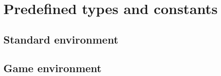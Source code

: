 \section{Predefined types and constants}
\label{sec:predefined}


\subsection{Standard environment}



\subsection{Game environment}

